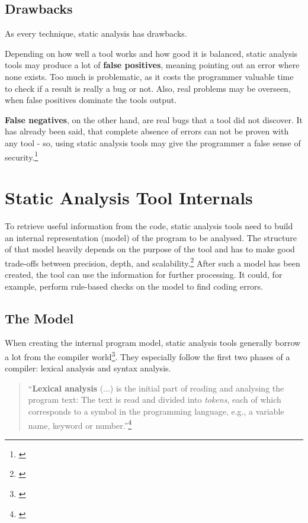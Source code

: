 \subsection{Drawbacks}

As every technique, static analysis has drawbacks. 

Depending on how well a tool works and how good it is balanced, static analysis tools may produce a lot of \textbf{false positives}, meaning pointing out an error where none exists. Too much  is problematic, as it costs the programmer valuable time to check if a result is really a bug or not. Also, real problems may be overseen, when false positives dominate the tools output.

\textbf{False negatives}, on the other hand, are real bugs that a tool did not discover. It has already been said, that complete absence of errors can not be proven with any tool - so, using static analysis tools may give the programmer a false sense of security.\footnote{\citep[23]{SecureProgramming}}


\section{Static Analysis Tool Internals}

To retrieve useful information from the code, static analysis tools need to build an internal representation (model) of the program to be analysed. The structure of that model heavily depends on the purpose of the tool and has to make good trade-offs between precision, depth, and scalability.\footnote{\citep[45]{SecureProgramming}} After such a model has been created, the tool can use the information for further processing. It could, for example, perform rule-based checks on the model to find coding errors.

\subsection{The Model}

When creating the internal program model, static analysis tools generally borrow a lot from the compiler world\footnote{\citep[72]{SecureProgramming}}. They especially follow the first two phases of a compiler: lexical analysis and syntax analysis.

\begin{quotation}
``\textbf{Lexical analysis} (...) is the initial part of reading and analysing the program text: The text is read and divided into \textit{tokens}, each of which corresponds to a symbol in the programming language, e.g., a variable name, keyword or number.''\footnote{\citep[2]{CompilerBasics}}
\end{quotation}

